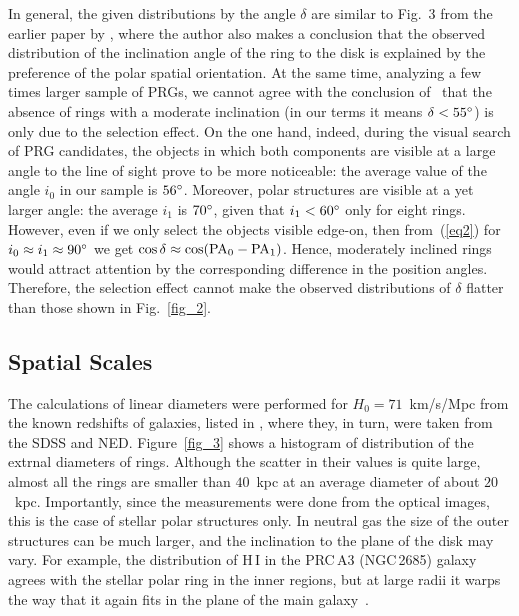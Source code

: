 \documentclass{ab}
\def\degr{\hbox{$^\circ$}}
\begin{document}
In general, the given distributions by the angle $\delta$ are
similar to Fig.~3 from the earlier paper by
\citet{Whitmore1991}, where the author also
makes a conclusion that the observed distribution of the
inclination angle of the ring to the disk is explained by  the
preference of the polar spatial orientation. At the same time,
analyzing a few times larger sample of PRGs, we cannot agree with
the conclusion of~\citet{Whitmore1991} that the absence
of rings with a moderate inclination (in our terms it means
$\delta<55\degr$) is only due to the selection effect. On the one
hand, indeed, during the visual search of PRG candidates, the
objects in which both components are visible at a large angle to
the line of sight prove to be more noticeable: the average value
of the angle $i_0$ in our sample is $56\degr$. Moreover, polar
structures are visible at a yet larger angle: the average $i_1$ is
$70\degr$, given that $i_1<60\degr$ only for eight rings. However,
even if we only select the objects visible edge-on, then
from~(\ref{eq2}) for $i_0\approx i_1\approx90\degr$ we
get \mbox{$\cos\delta\approx\cos({\rm PA}_0-{\rm PA}_1)$}. Hence,
moderately inclined rings would attract attention by the
corresponding difference in the position angles. Therefore, the
selection effect cannot make the observed distributions of
$\delta$ flatter than those shown in Fig.~\ref{fig_2}.


\subsection{Spatial Scales}


The calculations of linear diameters were performed for \mbox{$H_0
= 71$ km/s/Mpc} from the known redshifts of galaxies, listed in
\citet{Moiseev_SDSS}, where they, in turn, were
taken from the SDSS and NED. Figure~\ref{fig_3} shows a
histogram of distribution of the extrnal diameters of rings.
Although the scatter in their values is quite large, almost all
the rings are smaller than $40$~kpc at an average diameter of
about $20$~kpc. Importantly, since the measurements were done from
the optical images, this is the case of stellar polar structures
only. In neutral gas the size of the outer structures can be much
larger, and the inclination to the plane of the disk may vary. For
example, the distribution of H\,I in the PRC\,A3 (NGC\,2685)
galaxy agrees with the stellar polar ring in the inner regions,
but at large radii it warps the way that it again fits in the
plane of the main galaxy~\citep{Jozsa2009}.
\end{document}
